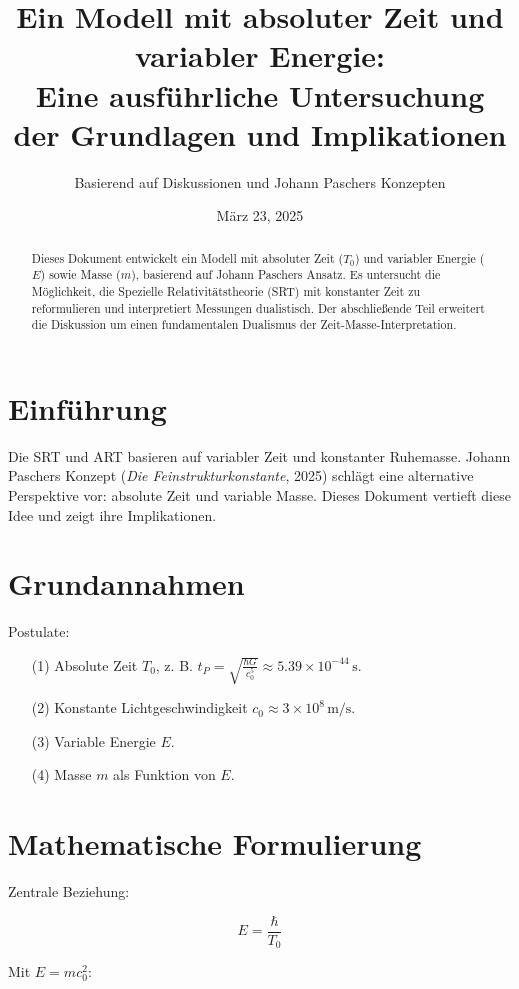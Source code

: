 \documentclass{article}
\title{Ein Modell mit absoluter Zeit und variabler Energie: \\Eine ausführliche Untersuchung der Grundlagen und Implikationen}
\author{Basierend auf Diskussionen und Johann Paschers Konzepten}
\date{März 23, 2025}
\begin{document}
	
	\maketitle
	
	\begin{abstract}
		Dieses Dokument entwickelt ein Modell mit absoluter Zeit (\( T_0 \)) und variabler Energie (\( E \)) sowie Masse (\( m \)), basierend auf Johann Paschers Ansatz. Es untersucht die Möglichkeit, die Spezielle Relativitätstheorie (SRT) mit konstanter Zeit zu reformulieren und interpretiert Messungen dualistisch. Der abschließende Teil erweitert die Diskussion um einen fundamentalen Dualismus der Zeit-Masse-Interpretation.
	\end{abstract}
	
	\section{Einführung}
	
	Die SRT und ART basieren auf variabler Zeit und konstanter Ruhemasse. Johann Paschers Konzept (\textit{Die Feinstrukturkonstante}, 2025) schlägt eine alternative Perspektive vor: absolute Zeit und variable Masse. Dieses Dokument vertieft diese Idee und zeigt ihre Implikationen.
	
	\section{Grundannahmen}
	
	Postulate:
	\begin{enumerate}
		\item[(1)] Absolute Zeit \( T_0 \), z. B. \( t_P = \sqrt{\frac{\hbar G}{c_0^5}} \approx 5.39 \times 10^{-44} \, \text{s} \).
		\item[(2)] Konstante Lichtgeschwindigkeit \( c_0 \approx 3 \times 10^8 \, \text{m/s} \).
		\item[(3)] Variable Energie \( E \).
		\item[(4)] Masse \( m \) als Funktion von \( E \).
	\end{enumerate}
	
	\section{Mathematische Formulierung}
	
	Zentrale Beziehung:
	
	\[
	E = \frac{\hbar}{T_0}
	\]
	
	Mit \( E = m c_0^2 \):
	
\end{document}
